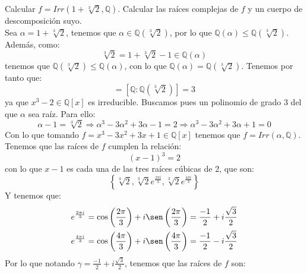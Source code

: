 \begin{ejercicio}
    Calcular $f= Irr(1+\sqrt[3]{2},\mathbb{Q})$. Calcular las raíces complejas de $f$ y un cuerpo de descomposición suyo.\\

    \noindent
    Sea $\alpha = 1+ \sqrt[3]{2}$, tenemos que $\alpha\in \mathbb{Q}\left(\sqrt[3]{2}\right)$, por lo que $\mathbb{Q}(\alpha)\leq \mathbb{Q}\left(\sqrt[3]{2}\right)$. Además, como:
    \begin{equation*}
        \sqrt[3]{2} = 1+\sqrt[3]{2} - 1 \in \mathbb{Q}(\alpha)
    \end{equation*}
    tenemos que $\mathbb{Q}\left(\sqrt[3]{2}\right) \leq \mathbb{Q}(\alpha)$, con lo que $\mathbb{Q}(\alpha) = \mathbb{Q}\left(\sqrt[3]{2}\right)$. Tenemos por tanto que:
    \begin{equation*}
        [\mathbb{Q}:\mathbb{Q}(\alpha)] = [\mathbb{Q}:\mathbb{Q}\left(\sqrt[3]{2}\right)] = 3
    \end{equation*}
    ya que $x^3-2\in \mathbb{Q}[x]$ es irreducible. Buscamos pues un polinomio de grado 3 del que $\alpha$ sea raíz. Para ello:
    \begin{equation*}
        \alpha - 1 = \sqrt[3]{2} \Longrightarrow \alpha^3 - 3\alpha^2 + 3\alpha - 1 = 2 \Longrightarrow \alpha^3 - 3\alpha^2 + 3\alpha + 1 = 0
    \end{equation*}
    Con lo que tomando $f = x^3-3x^2+3x+1\in \mathbb{Q}[x]$ tenemos que $f=Irr(\alpha,\mathbb{Q})$. Tenemos que las raíces de $f$ cumplen la relación:
    \begin{equation*}
        {(x-1)}^{3} = 2
    \end{equation*}
    con lo que $x-1$ es cada una de las tres raíces cúbicas de 2, que son:
    \begin{equation*}
        \left\{\sqrt[3]{2}, \sqrt[3]{2}e^{\frac{2\pi i}{3}}, \sqrt[3]{2}e^{\frac{4\pi i}{3}}\right\}
    \end{equation*}
    Y tenemos que:
    \begin{align*}
        e^{\frac{2\pi i}{3}} &= \cos\left(\frac{2\pi}{3}\right) + i\sen\left(\frac{2\pi}{3}\right) = \dfrac{-1}{2}+i\dfrac{\sqrt{3}}{2} \\
        e^{\frac{4\pi i}{3}} &= \cos\left(\frac{4\pi}{3}\right) + i\sen\left(\frac{4\pi}{3}\right) = \dfrac{-1}{2}-i\dfrac{\sqrt{3}}{2} \\
    \end{align*}
    Por lo que notando $\gamma = \frac{-1}{2}+i\frac{\sqrt{3}}{2}$, tenemos que las raíces de $f$ son:

\end{ejercicio}
